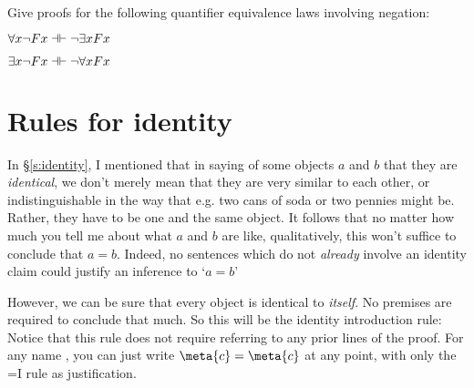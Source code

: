 \

\problempart Give proofs for the following quantifier equivalence laws involving negation:

\begin{earg}
\item $\forall x \enot Fx \pequiv \enot \exists xFx$
\item $\exists x \enot Fx \pequiv \enot \forall x Fx$
\end{earg}




\section{Rules for identity}\label{s:identityrules}

In \S\ref{s:identity}, I mentioned that in saying of some objects $a$ and $b$ that they are \emph{identical}, we don't merely mean that they are very similar to each other, or indistinguishable in the way that e.g. two cans of soda or two pennies might be. Rather, they have to be one and the same object. It follows that no matter how much you tell me about what  $a$ and $b$ are like, qualitatively, this won't suffice to conclude that $a=b$.  Indeed, no sentences which do not \emph{already} involve an identity claim could justify an inference to `$a=b$'


However, we can be sure that every object is identical to \emph{itself}. No premises are required to conclude that much. So this will be the identity introduction rule:
Notice that this rule does not require referring to any prior lines of the proof. For any name , you can just write $\meta{c}=\meta{c}$ at any point, with only the {=}I rule as justification.


